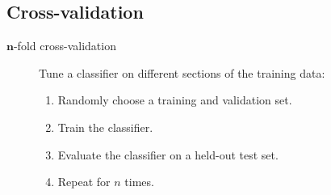 

\subsection{Cross-validation}

\begin{description}
    \item[$\mathbf{n}$-fold cross-validation] 
        Tune a classifier on different sections of the training data:
        \begin{enumerate}
            \item Randomly choose a training and validation set.
            \item Train the classifier.
            \item Evaluate the classifier on a held-out test set.
            \item Repeat for $n$ times.
        \end{enumerate}
\end{description}

